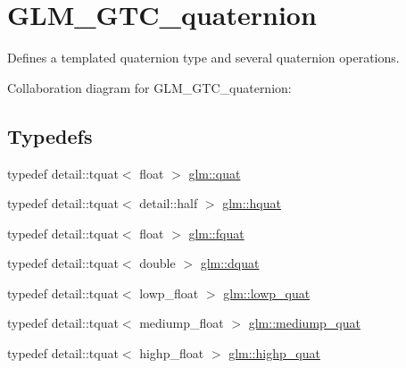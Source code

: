 \hypertarget{group__gtc__quaternion}{}\section{G\+L\+M\+\_\+\+G\+T\+C\+\_\+quaternion}
\label{group__gtc__quaternion}


Defines a templated quaternion type and several quaternion operations.  


Collaboration diagram for G\+L\+M\+\_\+\+G\+T\+C\+\_\+quaternion\+:
\subsection*{Typedefs}
\begin{DoxyCompactItemize}
\item 
typedef detail\+::tquat$<$ float $>$ \hyperlink{group__gtc__quaternion_gae334c5746195639da0ed726b747aeee3}{glm\+::quat}
\item 
typedef detail\+::tquat$<$ detail\+::half $>$ \hyperlink{group__gtc__quaternion_ga9601a7ab2375426d8f302f0be9507586}{glm\+::hquat}
\item 
typedef detail\+::tquat$<$ float $>$ \hyperlink{group__gtc__quaternion_ga026fc67b7357f270b8226f9bcd1ac2c1}{glm\+::fquat}
\item 
typedef detail\+::tquat$<$ double $>$ \hyperlink{group__gtc__quaternion_ga80d5f590dba4e894218e1263233b02bb}{glm\+::dquat}
\item 
typedef detail\+::tquat$<$ lowp\+\_\+float $>$ \hyperlink{group__gtc__quaternion_ga0754d8cacc7c48dd300ea7cd2846d1d8}{glm\+::lowp\+\_\+quat}
\item 
typedef detail\+::tquat$<$ mediump\+\_\+float $>$ \hyperlink{group__gtc__quaternion_gaf4523725b36d8d422f44ea28fd37d407}{glm\+::mediump\+\_\+quat}
\item 
typedef detail\+::tquat$<$ highp\+\_\+float $>$ \hyperlink{group__gtc__quaternion_ga86a81668075e0896b7d6cd395d1d01ec}{glm\+::highp\+\_\+quat}
\end{DoxyCompactItemize}

